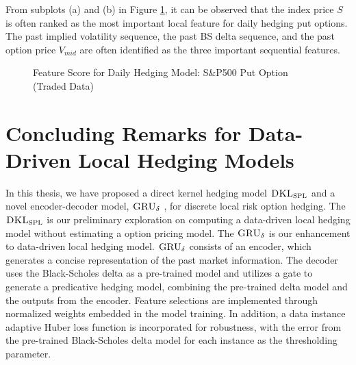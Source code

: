\documentclass[letterpaper,12pt,titlepage,oneside,final]{book}
\numberwithin{equation}{section}
\theoremstyle{definition}
\newcommand{\model}{\textsc{GRU}_\delta}
\newcommand{\DKLs}{\bf\textsc{DKL}_{\text{SPL}}}
\begin{document}
From subplots (a) and (b) in Figure \ref{fig:put1daily}, it can be observed that the index price $S$ is often ranked as the most important local feature for daily hedging put options. The past implied volatility sequence, the past  BS delta sequence, and the past option price $V_{mid}$  are often identified as the three important sequential features.
\begin{figure}[htp]
\centering
{}
\caption{Feature Score for Daily Hedging Model:  S\&P500 Put Option (Traded Data)} \label{fig:put1daily}
\end{figure}
\section{Concluding Remarks for Data-Driven Local Hedging Models}\label{sec:Localconclusion}

In this thesis, we have proposed a direct kernel hedging model $\DKLs$ and a novel encoder-decoder  model, $\model$ , for discrete local risk option hedging. The $\DKLs$ is our preliminary exploration on computing a data-driven local hedging model without estimating a option pricing model. The $\model$ is our enhancement to data-driven local hedging model. $\model$ consists of an encoder, which generates a concise representation of the past market  information. The decoder uses the Black-Scholes delta as a pre-trained model and utilizes a gate to generate a predicative hedging model,  combining the pre-trained delta model and the outputs from the encoder. Feature selections are implemented through normalized weights embedded in the model training. In addition, a data instance adaptive Huber loss function is incorporated  for robustness, with the error from the pre-trained Black-Scholes delta model for each instance as the thresholding parameter.
\end{document}
